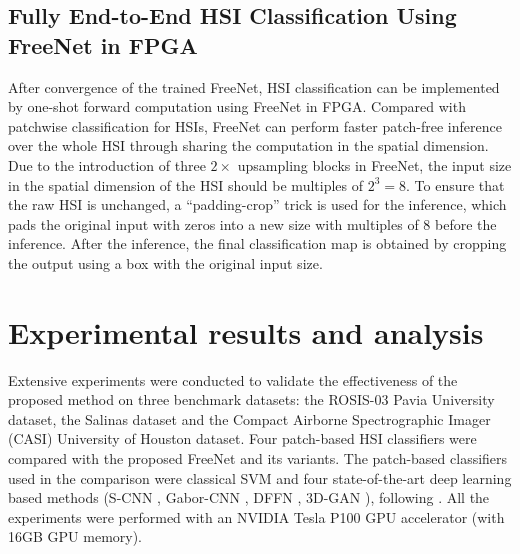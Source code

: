 \documentclass[journal]{IEEEtran}
\begin{document}
\subsection{Fully End-to-End HSI Classification Using FreeNet in FPGA}
After convergence of the trained FreeNet, HSI classification can be implemented by one-shot forward computation using FreeNet in FPGA.
Compared with patchwise classification for HSIs, FreeNet can perform faster patch-free inference over the whole HSI through sharing the computation in the spatial dimension.
Due to the introduction of three $2\times$ upsampling blocks in FreeNet, the input size in the spatial dimension of the HSI should be multiples of $2^3 = 8$.
To ensure that the raw HSI is unchanged, a ``padding-crop'' trick is used for the inference, which pads the original input with zeros into a new size with multiples of 8 before the inference.
After the inference, the final classification map is obtained by cropping the output using a box with the original input size.


\section{Experimental results and analysis}
\label{sec:exp}
Extensive experiments were conducted to validate the effectiveness of the proposed method on three benchmark datasets: the ROSIS-03 Pavia University dataset, the Salinas dataset and the Compact Airborne Spectrographic Imager (CASI) University of Houston dataset.
Four patch-based HSI classifiers were compared with the proposed FreeNet and its variants.
The patch-based classifiers used in the comparison were classical SVM \cite{melgani2004classification} and four state-of-the-art deep learning based methods (S-CNN \cite{liu2017supervised}, Gabor-CNN \cite{chen2017hyperspectral}, DFFN \cite{song2018hyperspectral}, 3D-GAN \cite{zhu2018generative}), following \cite{li2019deep}.
All the experiments were performed with an NVIDIA Tesla P100 GPU accelerator (with 16GB GPU memory).
\end{document}
